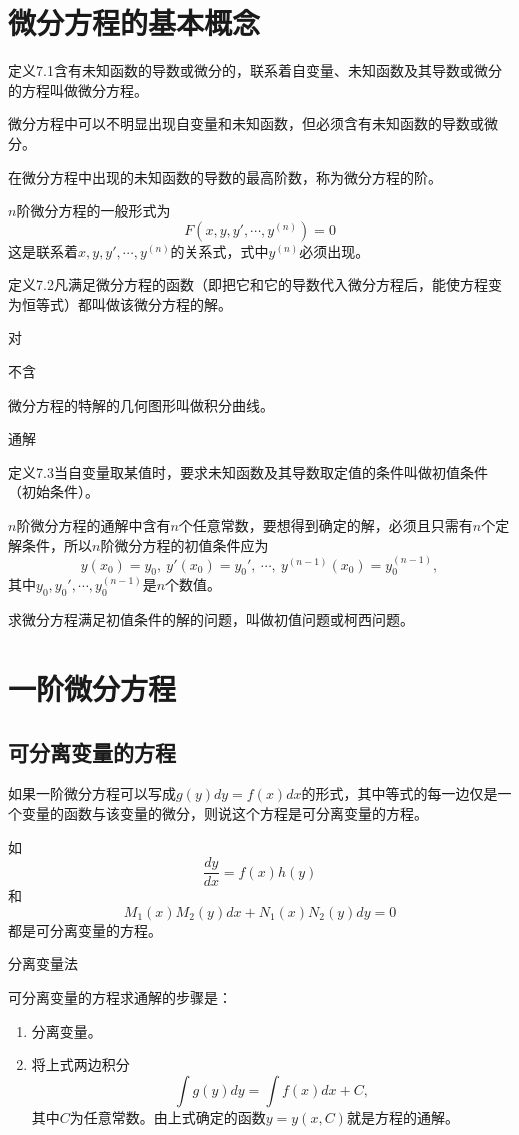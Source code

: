
\section{微分方程的基本概念}

定义7.1\quad 含有未知函数的导数或微分的，联系着自变量、未知函数及其导数或微分的方程叫做微分方程。

微分方程中可以不明显出现自变量和未知函数，但必须含有未知函数的导数或微分。

在微分方程中出现的未知函数的导数的最高阶数，称为微分方程的阶。

$n$阶微分方程的一般形式为
\[
F(x,y,y',\cdots,y^{(n)})=0 \tag{1}
\]
这是联系着$x,y,y',\cdots,y^{(n)}$的关系式，式中$y^{(n)}$必须出现。

定义7.2\quad 凡满足微分方程的函数（即把它和它的导数代入微分方程后，能使方程变为恒等式）都叫做该微分方程的解。

对

不含

微分方程的特解的几何图形叫做积分曲线。

通解

定义7.3\quad 当自变量取某值时，要求未知函数及其导数取定值的条件叫做初值条件（初始条件）。

$n$阶微分方程的通解中含有$n$个任意常数，要想得到确定的解，必须且只需有$n$个定解条件，所以$n$阶微分方程的初值条件应为
\[
y(x_0)=y_0,\ y'(x_0)=y_0',\ \cdots,\ y^{(n-1)}(x_0)=y_0^{(n-1)}, \tag{2}
\]
其中$y_0,y_0',\cdots,y_0^{(n-1)}$是$n$个数值。

求微分方程满足初值条件的解的问题，叫做初值问题或柯西问题。

\section{一阶微分方程}
\subsection{可分离变量的方程}

如果一阶微分方程可以写成$g(y)dy=f(x)dx$的形式，其中等式的每一边仅是一个变量的函数与该变量的微分，则说这个方程是可分离变量的方程。

如
\[
\frac{dy}{dx}=f(x)h(y)
\]
和
\[
M_1(x)M_2(y)dx+N_1(x)N_2(y)dy=0
\]
都是可分离变量的方程。

\noindent 分离变量法

可分离变量的方程求通解的步骤是：
\begin{enumerate}
    \item 分离变量。
    \item 将上式两边积分
\[
\int g(y)dy=\int f(x)dx+C,
\]
其中$C$为任意常数。由上式确定的函数$y=y(x,C)$就是方程的通解。
\end{enumerate}

